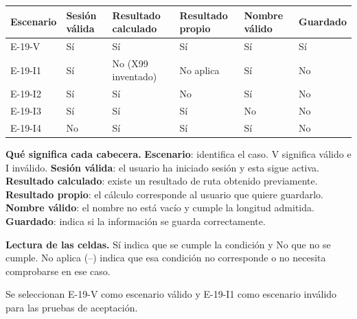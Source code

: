 \begingroup\fontsize{7.8}{11}\selectfont\setlength{\tabcolsep}{3pt}
\begin{tabularx}{\linewidth}{@{}*{6}{Y}@{}}\toprule
\textbf{Escenario} & \textbf{Sesión válida} & \textbf{Resultado calculado} & \textbf{Resultado propio} & \textbf{Nombre válido} & \textbf{Guardado}\\\midrule
E-19-V & Sí & Sí & Sí & Sí & Sí\\[3pt]
E-19-I1 & Sí & No (X99 inventado) & No aplica & Sí & No\\[3pt]
E-19-I2 & Sí & Sí & No & Sí & No\\[3pt]
E-19-I3 & Sí & Sí & Sí & No & No\\[3pt]
E-19-I4 & No & Sí & Sí & Sí & No\\[3pt]
\bottomrule\end{tabularx}\endgroup\par
{\fontsize{9}{11}\selectfont\textbf{Qué significa cada cabecera.} \textbf{Escenario}: identifica el caso. V significa válido e I inválido. \textbf{Sesión válida}: el usuario ha iniciado sesión y esta sigue activa. \textbf{Resultado calculado}: existe un resultado de ruta obtenido previamente. \textbf{Resultado propio}: el cálculo corresponde al usuario que quiere guardarlo. \textbf{Nombre válido}: el nombre no está vacío y cumple la longitud admitida. \textbf{Guardado}: indica si la información se guarda correctamente.\par\textbf{Lectura de las celdas.} Sí indica que se cumple la condición y No que no se cumple. No aplica (--) indica que esa condición no corresponde o no necesita comprobarse en ese caso.\par}


Se seleccionan E-19-V como escenario válido y E-19-I1 como escenario inválido para las pruebas de aceptación.\par


